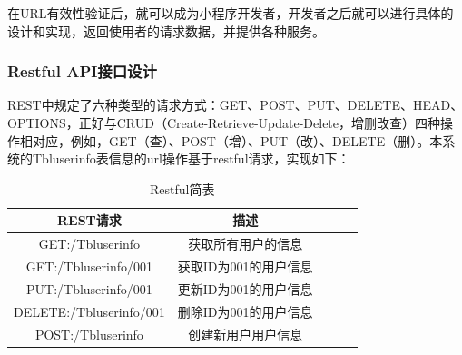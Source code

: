 \documentclass[a4paper]{ltxdoc}
\begin{document}
{		在URL有效性验证后，就可以成为小程序开发者，开发者之后就可以进行具体的设计和实现，返回使用者的请求数据，并提供各种服务。
		
		\subsubsection{Restful API接口设计}
		REST中规定了六种类型的请求方式：GET、POST、PUT、DELETE、HEAD、OPTIONS，正好与CRUD（Create-Retrieve-Update-Delete，增删改查）四种操作相对应，例如，GET（查）、POST（增）、PUT（改）、DELETE（删）。本系统的Tbluserinfo表信息的url操作基于restful请求，实现如下：
		
		\begin{center}
			\begin{table}[!htb]
				\centering
				\caption{Restful简表}
				\begin{tabular}{ccccc}
					\hline
					REST请求                    				  & 描述\\ \hline
					\multirow{1}{*}{GET:/Tbluserinfo} 		  &获取所有用户的信息\\ \hline
					\multirow{1}{*}{GET:/Tbluserinfo/001}     &获取ID为001的用户信息\\ \hline
					\multirow{1}{*}{PUT:/Tbluserinfo/001}     &更新ID为001的用户信息\\ \hline
					\multirow{1}{*}{DELETE:/Tbluserinfo/001}  &删除ID为001的用户信息\\ \hline
					\multirow{1}{*}{POST:/Tbluserinfo}        &创建新用户用户信息\\ \hline
				\end{tabular}
			\end{table}
		\end{center}
		
		
		
		
		
}
\end{document}
